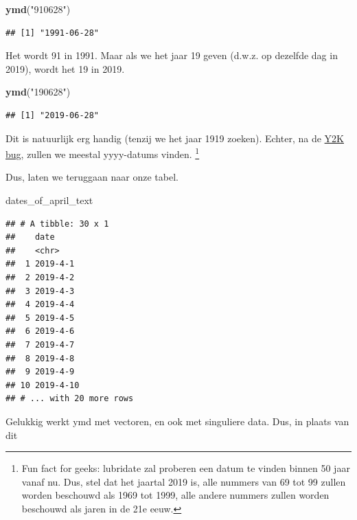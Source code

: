 \documentclass[]{tufte-book}
\newenvironment{Shaded}{}{}
\newcommand{\DataTypeTok}[1]{\textcolor[rgb]{0.56,0.13,0.00}{#1}}
\newcommand{\KeywordTok}[1]{\textcolor[rgb]{0.00,0.44,0.13}{\textbf{#1}}}
\newcommand{\NormalTok}[1]{#1}
\newcommand{\OperatorTok}[1]{\textcolor[rgb]{0.40,0.40,0.40}{#1}}
\newcommand{\StringTok}[1]{\textcolor[rgb]{0.25,0.44,0.63}{#1}}
\begin{document}
\begin{Shaded}
\begin{Highlighting}[]
\KeywordTok{ymd}\NormalTok{(}\StringTok{"910628"}\NormalTok{)}
\end{Highlighting}
\end{Shaded}

\begin{verbatim}
## [1] "1991-06-28"
\end{verbatim}

Het wordt 91 in 1991. Maar als we het jaar 19 geven (d.w.z. op dezelfde dag in 2019), wordt het 19 in 2019.

\begin{Shaded}
\begin{Highlighting}[]
\KeywordTok{ymd}\NormalTok{(}\StringTok{"190628"}\NormalTok{)}
\end{Highlighting}
\end{Shaded}

\begin{verbatim}
## [1] "2019-06-28"
\end{verbatim}

Dit is natuurlijk erg handig (tenzij we het jaar 1919 zoeken). Echter, na de \href{https://www.britannica.com/technology/Y2K-bug}{Y2K bug}, zullen we meestal yyyy-datums vinden. \footnote{Fun fact for geeks: lubridate zal proberen een datum te vinden binnen 50 jaar vanaf nu. Dus, stel dat het jaartal 2019 is, alle nummers van 69 tot 99 zullen worden beschouwd als 1969 tot 1999, alle andere nummers zullen worden beschouwd als jaren in de 21e eeuw.}

Dus, laten we teruggaan naar onze tabel.

\begin{Shaded}
\begin{Highlighting}[]
\NormalTok{dates_of_april_text}
\end{Highlighting}
\end{Shaded}

\begin{verbatim}
## # A tibble: 30 x 1
##    date     
##    <chr>    
##  1 2019-4-1 
##  2 2019-4-2 
##  3 2019-4-3 
##  4 2019-4-4 
##  5 2019-4-5 
##  6 2019-4-6 
##  7 2019-4-7 
##  8 2019-4-8 
##  9 2019-4-9 
## 10 2019-4-10
## # ... with 20 more rows
\end{verbatim}

Gelukkig werkt ymd met vectoren, en ook met singuliere data. Dus, in plaats van dit

\begin{Shaded}
\end{Shaded}
\end{document}
